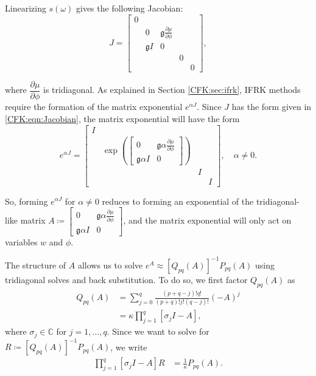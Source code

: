 \documentclass{csri19}
\newcommand{\CFKg}{\mathfrak{g}}
\begin{document}
Linearizing $s(\omega)$ gives the following Jacobian:
\begin{equation}\label{CFK:eqn:Jacobian} J = \begin{bmatrix}
0&                  &                                                   &  & \\
 & 0                & \CFKg \frac{\partial \mu}{\partial \phi} &  & \\
 & \CFKg  I & 0                                                 &  & \\
 &                  &                                                   &0 & \\
 &                  &                                                   &  &0\end{bmatrix},\end{equation}

where $\dfrac{\partial \mu}{\partial \phi}$ is tridiagonal. As explained 
in Section \ref{CFK:sec:ifrk}, IFRK methods require the formation of the 
matrix exponential $e^{\alpha J}$. Since $J$ has the form given in 
\ref{CFK:eqn:Jacobian}, the matrix exponential will have the form
\[ e^{\alpha J} = \begin{bmatrix}
I&                                                                     &  & \\
 & \exp\left(\begin{bmatrix}0 & \CFKg \alpha \frac{\partial \mu}{\partial \phi} \\ 
  \CFKg \alpha I & 0     \end{bmatrix}\right)     &  & \\                                      
 &                                                                     &I & \\
 &                                                                     &  &I\end{bmatrix}, \quad \alpha \neq 0.\]

So, forming $e^{\alpha J}$ for $\alpha \neq 0$ reduces to forming an 
exponential of the tridiagonal-like matrix $A \coloneqq 
\begin{bmatrix}
   0              & \CFKg \alpha \frac{\partial \mu}{\partial \phi} \\
 \CFKg \alpha I & 0  \end{bmatrix}$, and the matrix exponential will 
only act on variables $w$ and $\phi$. 

The structure of $A$ allows us to solve 
$e^A \approx \left[Q_{pq}(A)\right]^{-1}P_{pq}(A)$ using tridiagonal solves 
and back substitution. To do so, we first factor $Q_{pq}(A)$ as
\begin{align*}
Q_{pq}(A) &= \sum_{j=0}^q\frac{(p+q-j)!q!}{(p+q)!j!(q-j)!}(-A)^j\\
          &= \kappa\prod_{j=1}^q\left[\sigma_jI-A\right],
\end{align*}
where $\sigma_j\in \mathbb{C}$ for $j=1,\dots,q$. Since we want to solve 
for $R \coloneqq \left[Q_{pq}(A)\right]^{-1}P_{pq}(A)$, we write
\begin{align*}
\prod_{j=1}^q\left[\sigma_jI-A\right]R &= \frac{1}{\kappa}P_{pq}(A).
\end{align*}
\end{document}
